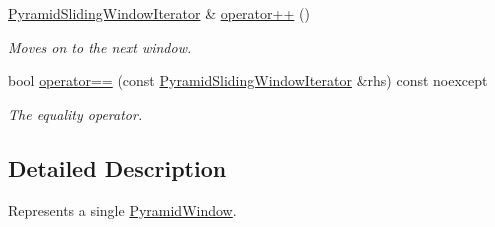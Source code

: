 \begin{DoxyCompactItemize}
\hyperlink{classdg_1_1deepcore_1_1imagery_1_1_pyramid_sliding_window_iterator}{Pyramid\+Sliding\+Window\+Iterator} \& \hyperlink{group___imagery_module_gaa6990163252dcca167db1dde03c55100}{operator++} ()
\begin{DoxyCompactList}\small\item\em Moves on to the next window. \end{DoxyCompactList}\item 
bool \hyperlink{group___imagery_module_gaa1566b49b13ee8b98e58d748aba156b3}{operator==} (const \hyperlink{classdg_1_1deepcore_1_1imagery_1_1_pyramid_sliding_window_iterator}{Pyramid\+Sliding\+Window\+Iterator} \&rhs) const noexcept
\begin{DoxyCompactList}\small\item\em The equality operator. \end{DoxyCompactList}\end{DoxyCompactItemize}


\subsection{Detailed Description}
Represents a single \hyperlink{structdg_1_1deepcore_1_1imagery_1_1_pyramid_window}{Pyramid\+Window}. 